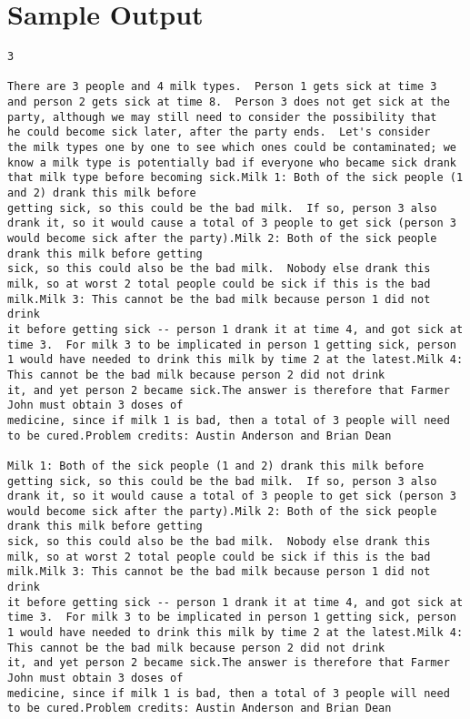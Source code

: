 \documentclass[12pt]{article}
\begin{document}
\section*{Sample Output}
\begin{verbatim}
3

There are 3 people and 4 milk types.  Person 1 gets sick at time 3
and person 2 gets sick at time 8.  Person 3 does not get sick at the
party, although we may still need to consider the possibility that
he could become sick later, after the party ends.  Let's consider
the milk types one by one to see which ones could be contaminated; we
know a milk type is potentially bad if everyone who became sick drank
that milk type before becoming sick.Milk 1: Both of the sick people (1 and 2) drank this milk before
getting sick, so this could be the bad milk.  If so, person 3 also
drank it, so it would cause a total of 3 people to get sick (person 3
would become sick after the party).Milk 2: Both of the sick people drank this milk before getting
sick, so this could also be the bad milk.  Nobody else drank this
milk, so at worst 2 total people could be sick if this is the bad
milk.Milk 3: This cannot be the bad milk because person 1 did not drink
it before getting sick -- person 1 drank it at time 4, and got sick at
time 3.  For milk 3 to be implicated in person 1 getting sick, person
1 would have needed to drink this milk by time 2 at the latest.Milk 4: This cannot be the bad milk because person 2 did not drink
it, and yet person 2 became sick.The answer is therefore that Farmer John must obtain 3 doses of
medicine, since if milk 1 is bad, then a total of 3 people will need
to be cured.Problem credits: Austin Anderson and Brian Dean

Milk 1: Both of the sick people (1 and 2) drank this milk before
getting sick, so this could be the bad milk.  If so, person 3 also
drank it, so it would cause a total of 3 people to get sick (person 3
would become sick after the party).Milk 2: Both of the sick people drank this milk before getting
sick, so this could also be the bad milk.  Nobody else drank this
milk, so at worst 2 total people could be sick if this is the bad
milk.Milk 3: This cannot be the bad milk because person 1 did not drink
it before getting sick -- person 1 drank it at time 4, and got sick at
time 3.  For milk 3 to be implicated in person 1 getting sick, person
1 would have needed to drink this milk by time 2 at the latest.Milk 4: This cannot be the bad milk because person 2 did not drink
it, and yet person 2 became sick.The answer is therefore that Farmer John must obtain 3 doses of
medicine, since if milk 1 is bad, then a total of 3 people will need
to be cured.Problem credits: Austin Anderson and Brian Dean


\end{verbatim}
\end{document}
